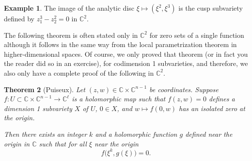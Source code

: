 \documentclass[12pt,openany]{book}
\newcommand{\C}{{\mathbb{C}}}
\newcommand{\myindex}[1]{#1\index{#1}}
\theoremstyle{plain}
\newtheorem{thm}{Theorem}[section]
\theoremstyle{remark}
\theoremstyle{definition}
\theoremstyle{exercise}
\theoremstyle{example}
\newtheorem{example}[thm]{Example}
\begin{document}
\begin{example}
The image of the analytic disc
$\xi \mapsto (\xi^2,\xi^3)$ is the cusp subvariety
defined by $z_1^3-z_2^2 = 0$ in $\C^2$.
\end{example}


The following theorem is often stated only in $\C^2$ for zero sets of
a single function although it follows in
the same way from the local parametrization theorem in higher-dimensional
spaces.  Of course, we only
proved that theorem (or in fact you the reader did so in an exercise), for
codimension 1 subvarieties, and therefore, we also only have a complete
proof of the following in $\C^2$.

\begin{thm}[\myindex{Puiseux}]
Let $(z,w) \in \C \times \C^{n-1}$ be coordinates.
Suppose $f \colon U \subset \C \times \C^{n-1} \to \C^\ell$
is a holomorphic map such that
$f(z,w) = 0$ defines a dimension 1 subvariety $X$ of $U$,
$0 \in X$,
and $w \mapsto f(0,w)$ has an isolated zero at the origin.

Then there exists an integer $k$ and a holomorphic function $g$ defined near
the origin in $\C$ such that
for all $\xi$ near the origin
\begin{equation*}
f\bigl(\xi^k,g(\xi)\bigr) = 0 .
\end{equation*}
\end{thm}
\end{document}
